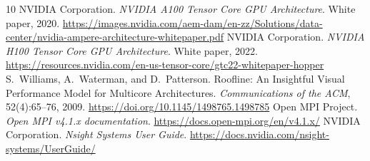 \documentclass[10pt,a4paper]{article}
\begin{document}
\begin{thebibliography}{10}\small
{} NVIDIA Corporation. \emph{NVIDIA A100 Tensor Core GPU Architecture}. White paper, 2020. \url{https://images.nvidia.com/aem-dam/en-zz/Solutions/data-center/nvidia-ampere-architecture-whitepaper.pdf}
 NVIDIA Corporation. \emph{NVIDIA H100 Tensor Core GPU Architecture}. White paper, 2022. \url{https://resources.nvidia.com/en-us-tensor-core/gtc22-whitepaper-hopper}
 S.~Williams, A.~Waterman, and D.~Patterson. Roofline: An Insightful Visual Performance Model for Multicore Architectures. \emph{Communications of the ACM}, 52(4):65--76, 2009. \url{https://doi.org/10.1145/1498765.1498785}
 Open MPI Project. \emph{Open MPI v4.1.x documentation}. \url{https://docs.open-mpi.org/en/v4.1.x/}
 NVIDIA Corporation. \emph{Nsight Systems User Guide}. \url{https://docs.nvidia.com/nsight-systems/UserGuide/}
\end{thebibliography}
\end{document}
